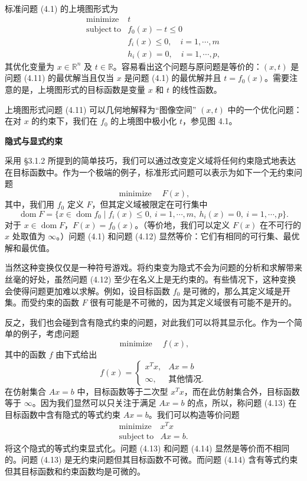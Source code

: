 \documentclass[UTF8,12pt,a4paper,fontset=fandol]{ctexart}
\begin{document}
标准问题 (4.1) 的上境图形式为
\begin{equation}
\begin{array}{ll}
\mathop{\mathrm{minimize}} & t\\
\mathrm{subject\ to} & f_0(x)-t\leq 0\\
& f_i(x)\leq 0,\quad i=1,\cdots,m\\
& h_i(x)=0,\quad i=1,\cdots,p,
\end{array}
\tag{4.11}
\end{equation}
其优化变量为 $x\in\mathbb{R}^n$ 及 $t\in\mathbb{R}$。容易看出这个问题与原问题是等价的：$(x,t)$ 是问题 (4.11) 的最优解当且仅当 $x$ 是问题 (4.1) 的最优解并且 $t=f_0(x)$。需要注意的是，上境图形式的目标函数是变量 $x$ 和 $t$ 的线性函数。

上境图形式问题 (4.11) 可以几何地解释为“图像空间” $(x,t)$ 中的一个优化问题：在对 $x$ 的约束下，我们在 $f_0$ 的上境图中极小化 $t$，参见图 4.1。

\noindent\textbf{隐式与显式约束}

采用 §3.1.2 所提到的简单技巧，我们可以通过改变定义域将任何约束隐式地表达在目标函数中。作为一个极端的例子，标准形式问题可以表示为如下一个无约束问题
\begin{equation}
\mathop{\mathrm{minimize}}\quad F(x),
\tag{4.12}
\end{equation}
其中，我们用 $f_0$ 定义 $F$，但其定义域被限定在可行集中
\[
\operatorname{dom} F=\{x\in\operatorname{dom} f_0\mid f_i(x)\leq 0,\ i=1,\cdots,m,\ h_i(x)=0,\ i=1,\cdots,p\}.
\]
对于 $x\in\operatorname{dom} F$，$F(x)=f_0(x)$。（等价地，我们可以定义 $F(x)$ 在不可行的 $x$ 处取值为 $\infty$。）问题 (4.1) 和问题 (4.12) 显然等价：它们有相同的可行集、最优解和最优值。

当然这种变换仅仅是一种符号游戏。将约束变为隐式不会为问题的分析和求解带来丝毫的好处，虽然问题 (4.12) 至少在名义上是无约束的。有些情况下，这种变换会使得问题更加难以求解。例如，设目标函数 $f_0$ 是可微的，那么其定义域是开集。而受约束的函数 $F$ 很有可能是不可微的，因为其定义域很有可能不是开的。

反之，我们也会碰到含有隐式约束的问题，对此我们可以将其显示化。作为一个简单的例子，考虑问题
\begin{equation}
\mathop{\mathrm{minimize}}\quad f(x),
\tag{4.13}
\end{equation}
其中的函数 $f$ 由下式给出
\[
f(x)=
\begin{cases}
x^Tx, & Ax=b\\
\infty, & \text{其他情况}.
\end{cases}
\]
在仿射集合 $Ax=b$ 中，目标函数等于二次型 $x^Tx$，而在此仿射集合外，目标函数等于 $\infty$。因为我们显然可以只关注于满足 $Ax=b$ 的点，所以，称问题 (4.13) 在目标函数中含有隐式的等式约束 $Ax=b$。我们可以构造等价问题
\begin{equation}
\begin{array}{ll}
\mathop{\mathrm{minimize}} & x^Tx\\
\mathrm{subject\ to} & Ax=b.
\end{array}
\tag{4.14}
\end{equation}
将这个隐式的等式约束显式化。问题 (4.13) 和问题 (4.14) 显然是等价而不相同的。问题 (4.13) 是无约束问题但其目标函数不可微。而问题 (4.14) 含有等式约束但其目标函数和约束函数均是可微的。
\end{document}
